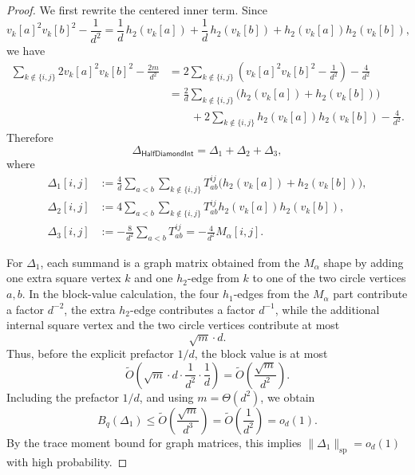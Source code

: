 \documentclass[12pt]{article}
\begin{document}
\begin{proof}
We first rewrite the centered inner term. Since
\[
    v_k[a]^2v_k[b]^2-\frac1{d^2}
    =
    \frac1d\,h_2(v_k[a])
    +
    \frac1d\,h_2(v_k[b])
    +
    h_2(v_k[a])h_2(v_k[b]),
\]
we have
\[
\begin{aligned}
    \sum_{k\notin\{i,j\}}2v_k[a]^2v_k[b]^2-\frac{2m}{d^2}
    &=
    2\sum_{k\notin\{i,j\}}
    \left(
        v_k[a]^2v_k[b]^2-\frac1{d^2}
    \right)
    -
    \frac{4}{d^2}                                               \\
    &=
    \frac{2}{d}
    \sum_{k\notin\{i,j\}}
    \bigl(h_2(v_k[a])+h_2(v_k[b])\bigr)                         \\
    &\qquad
    +
    2\sum_{k\notin\{i,j\}}
    h_2(v_k[a])h_2(v_k[b])
    -
    \frac{4}{d^2}.
\end{aligned}
\]
Therefore
\[
    \Delta_{\mathsf{HalfDiamondInt}}
    =
    \Delta_1+\Delta_2+\Delta_3,
\]
where
\[
\begin{aligned}
    \Delta_1[i,j]
    &:=
    \frac{4}{d}
    \sum_{a<b}
    \sum_{k\notin\{i,j\}}
    T_{ab}^{ij}
    \bigl(h_2(v_k[a])+h_2(v_k[b])\bigr),                       \\
    \Delta_2[i,j]
    &:=
    4
    \sum_{a<b}
    \sum_{k\notin\{i,j\}}
    T_{ab}^{ij}
    h_2(v_k[a])h_2(v_k[b]),                                    \\
    \Delta_3[i,j]
    &:=
    -\frac{8}{d^2}
    \sum_{a<b}T_{ab}^{ij}
    =
    -\frac{4}{d^2}M_\alpha[i,j].
\end{aligned}
\]

For \(\Delta_1\), each summand is a graph matrix obtained from the \(M_\alpha\) shape by adding
one extra square vertex \(k\) and one \(h_2\)-edge from \(k\) to one of the two circle vertices
\(a,b\). In the block-value calculation, the four \(h_1\)-edges from the \(M_\alpha\) part contribute
a factor \(d^{-2}\), the extra \(h_2\)-edge contributes a factor \(d^{-1}\), while the additional internal
square vertex and the two circle vertices contribute at most
\[
    \sqrt m\cdot d.
\]
Thus, before the explicit prefactor \(1/d\), the block value is at most
\[
    \widetilde O\!\left(
        \sqrt m\cdot d\cdot \frac1{d^2}\cdot \frac1d
    \right)
    =
    \widetilde O\!\left(\frac{\sqrt m}{d^2}\right).
\]
Including the prefactor \(1/d\), and using \(m=\Theta(d^2)\), we obtain
\[
    B_q(\Delta_1)
    \le
    \widetilde O\!\left(\frac{\sqrt m}{d^3}\right)
    =
    \widetilde O\!\left(\frac1{d^2}\right)
    =
    o_d(1).
\]
By the trace moment bound for graph matrices, this implies
\(
    \|\Delta_1\|_{\mathrm{sp}}=o_d(1)
\)
with high probability.


\end{proof}
\end{document}
